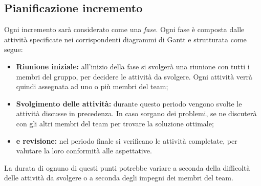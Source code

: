 \subsection{Pianificazione incremento}
Ogni incremento sarà considerato come una \textit{fase}. Ogni fase è composta dalle attività specificate nei corrispondenti diagrammi di Gantt e strutturata come segue:
\begin{itemize}
\item \textbf{Riunione iniziale:} all'inizio della fase si svolgerà una riunione con tutti i membri del gruppo, per decidere le attività da svolgere. Ogni attività verrà quindi assegnata ad uno o più membri del team;
\item \textbf{Svolgimento delle attività:} durante questo periodo vengono svolte le attività discusse in precedenza. In caso sorgano dei problemi, se ne discuterà con gli altri membri del team per trovare la soluzione ottimale;
\item \textbf{ e revisione:} nel periodo finale si verificano le attività completate, per valutare la loro conformità alle aspettative.
\end{itemize}
La durata di ognuno di questi punti potrebbe variare a seconda della difficoltà delle attività da svolgere o a seconda degli impegni dei membri del team.
\newpage
